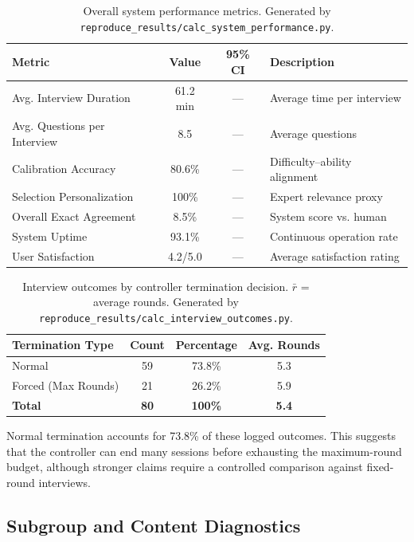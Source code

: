 ﻿\documentclass[final,3p,times,authoryear]{elsarticle}
\begin{document}
\begin{table}[H]
\centering
\caption{Overall system performance metrics. Generated by \texttt{reproduce\_results/calc\_system\_performance.py}.}
\label{tab:system_performance}
\footnotesize
\setlength{\tabcolsep}{4pt}
\begin{tabularx}{\textwidth}{l c c Y}
\toprule
\textbf{Metric} & \textbf{Value} & \textbf{95\% CI} & \textbf{Description} \\
\midrule
Avg. Interview Duration & 61.2 min & --- & Average time per interview \\
Avg. Questions per Interview & 8.5 & --- & Average questions \\
Calibration Accuracy & 80.6\% & --- & Difficulty--ability alignment \\
Selection Personalization & 100\% & --- & Expert relevance proxy \\
Overall Exact Agreement & 8.5\% & --- & System score vs. human \\
System Uptime & 93.1\% & --- & Continuous operation rate \\
User Satisfaction & 4.2/5.0 & --- & Average satisfaction rating \\
\bottomrule
\end{tabularx}
\end{table}

\begin{table}[H]
\centering
\caption{Interview outcomes by controller termination decision. $\bar{r}$ = average rounds. Generated by \texttt{reproduce\_results/calc\_interview\_outcomes.py}.}
\label{tab:interview_outcomes}
\begin{tabular}{lccc}
\toprule
\textbf{Termination Type} & \textbf{Count} & \textbf{Percentage} & \textbf{Avg. Rounds} \\
\midrule
Normal & 59 & 73.8\% & 5.3 \\
Forced (Max Rounds) & 21 & 26.2\% & 5.9 \\
\midrule
\textbf{Total} & \textbf{80} & \textbf{100\%} & \textbf{5.4} \\
\bottomrule
\end{tabular}
\end{table}

\noindent Normal termination accounts for 73.8\% of these logged outcomes. This suggests that the controller can end many sessions before exhausting the maximum-round budget, although stronger claims require a controlled comparison against fixed-round interviews.

\subsection{Subgroup and Content Diagnostics}
\end{document}
